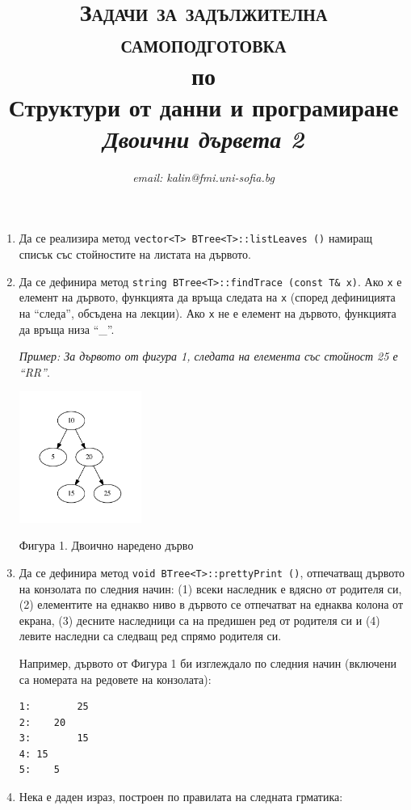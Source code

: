 \documentclass[12pt,a4paper]{article}
\author{\textit{email: kalin@fmi.uni-sofia.bg}}
\title{\textsc{Задачи за задължителна самоподготовка} \\
по \\
Структури от данни и програмиране\\
\textit{Двоични дървета 2}}
\begin{document}
\maketitle


\begin{enumerate}

	\item Да се реализира метод \texttt{vector<T> BTree<T>::listLeaves ()} намиращ списък със стойностите на листата на дървото.

	\item Да се дефинира метод \texttt{string BTree<T>::findTrace (const T\& x)}. Ако \texttt{x} е елемент на дървото, функцията да връща следата на \texttt{x} (според дефиницията на ``следа'', обсъдена на лекции). Ако \texttt{x} не е елемент на дървото, функцията да връща низа ``\_''.

	\textit{Пример: За дървото от фигура 1, следата на елемента със стойност 25 е ``RR''}.

	\begin{flushleft}
	\includegraphics[width=4cm]{images/tree1}

	Фигура 1. Двоично наредено дърво
	\end{flushleft}

	\item Да се дефинира метод \texttt{void BTree<T>::prettyPrint ()}, отпечатващ дървото на конзолата по следния начин: (1) всеки наследник е вдясно от родителя си, (2) елементите на еднакво ниво в дървото се отпечатват на еднаква колона от екрана, (3) десните наследници са на предишен ред от родителя си и (4) левите наследни са следващ ред спрямо родителя си.

	Например, дървото от Фигура 1 би изглеждало по следния начин (включени са номерата на редовете на конзолата):

\begin{verbatim}
1:        25
2:    20	
3:        15
4: 15
5:    5
\end{verbatim}


	\item Нека е даден израз, построен по правилата на следната грматика:


\end{enumerate}
\end{document}
